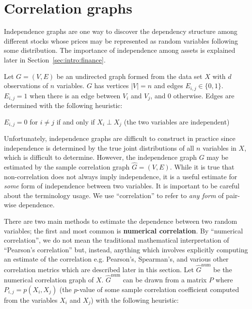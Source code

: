 \section{Correlation graphs}
\label{sec:intro:correlation}

Independence graphs are one way to discover the dependency structure among
different stocks whose prices may be represented as random variables following
some distribution. The importance of independence among assets is explained 
later in Section~\ref{sec:intro:finance}.

Let $G=(V,E)$ be an undirected graph formed from the data set 
$X$ with $d$ observations of $n$ variables. 
$G$ has vertices $|V| = n$ and edges $E_{i,j}\in\{0,1\}$. 
$E_{i,j}=1$ when there is an edge between $V_i$ and $V_j$, and 0 otherwise. 
Edges are determined with the following heuristic: \\

\begin{algorithm}
	$E_{i,j} = 0$ for $i\neq j$ if and only if $X_i \perp X_j$ (the two 
	variables are independent)
\end{algorithm}

Unfortunately, independence graphs are difficult to construct in practice since 
independence is determined by the true joint distributions of all $n$ variables 
in $X$, which is difficult to determine. However, the independence graph 
$G$ may be estimated by the sample correlation graph 
$\hat{G}=(V,E)$. While it is true that non-correlation does 
not always imply independence, it is a useful estimate for \textit{some} form 
of independence between two variables. 
It is important to be careful about the terminology usage. We use
``correlation'' to refer to \textit{any form} of pair-wise dependence. 

There are two main methods to estimate the dependence between two random 
variables; the first and most common is \textbf{numerical correlation}. 
By ``numerical correlation'', we do not mean the traditional mathematical 
interpretation of ``Pearson's correlation'' but, instead, anything which 
involves explicitly computing an estimate of the correlation e.g. Pearson's, 
Spearman's, and various other correlation metrics which are described later in 
this section. 
Let $\hat{G}^{\text{num}}$ be the numerical correlation graph of $X$. 
$\hat{G}^{\text{num}}$ can be drawn from a matrix $P$ where 
$P_{i,j}=p(X_i,X_j)$ (the $p$-value of some sample correlation coefficient 
computed from the variables $X_i$ and $X_j$) with the following heuristic:\\

